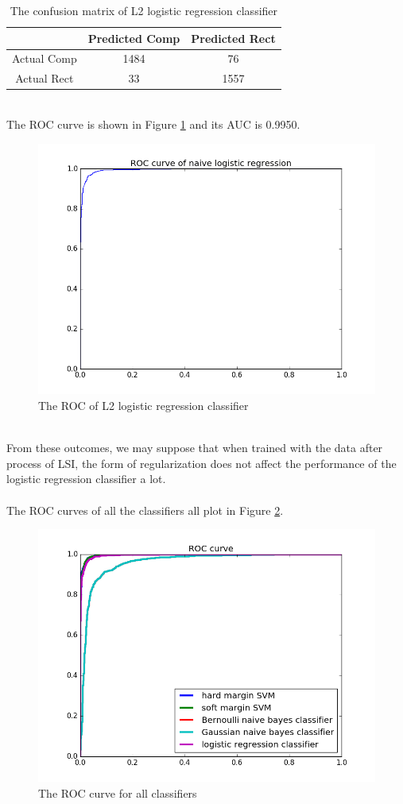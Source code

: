 \documentclass{article}
\begin{document}
\begin{table}
\begin{center}
\caption{The confusion matrix of L2 logistic regression classifier}
\label{tb:confu_lr2}
\begin{tabular}{|c|c|c|}
\hline
& Predicted Comp& Predicted Rect\\
\hline
Actual Comp&1484&76\\
\hline
Actual Rect&33&1557\\
\hline
\end{tabular}
\end{center}
\end{table}
\\
The ROC curve is shown in Figure \ref{fig:roc_lr2} and its AUC is 0.9950.\\
\begin{figure}[htbp]
\centering
\includegraphics[width=.6\textwidth]{h_logistic_regression_l2_roc.png}
\caption{The ROC of L2 logistic regression classifier}
\label{fig:roc_lr2}
\end{figure}
\\
From these outcomes, we may suppose that when trained with the data after process of LSI, the form of regularization does not affect the performance of the logistic regression classifier a lot.\\
\\
The ROC curves of all the classifiers all plot in Figure \ref{fig:roc}.\\
\begin{figure}[htbp]
\centering
\includegraphics[width=.6\textwidth]{roc.png}
\caption{The ROC curve for all classifiers}
\label{fig:roc}
\end{figure}
\end{document}
